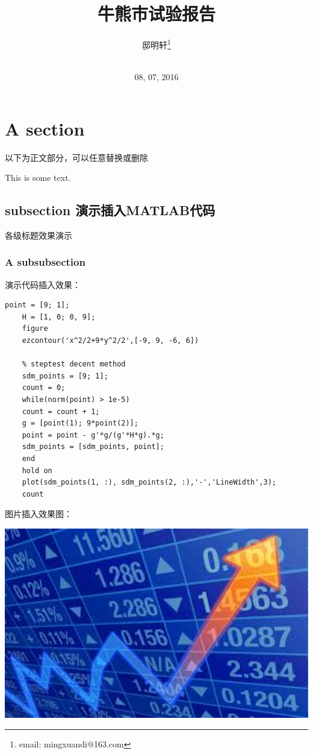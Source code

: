 \documentclass[10pt,a4paper]{article}
\author{邸明轩\footnote{email: mingxuandi@163.com}\\[2ex]
	\\[2ex]}
\title{牛熊市试验报告 \uppercase\expandafter{\romannumeral1}}
\date{08, 07, 2016}
\begin{document}
	
	\makeatletter
	\let\@afterindentfalse\@afterindenttrue
	\@afterindenttrue
	\makeatother
	\setlength{\parindent}{2em}  %
	
	\maketitle
	
	\section{A section}
	以下为正文部分，可以任意替换或删除
	
	This is some text.
	
	\subsection{ subsection 演示插入MATLAB代码}
	各级标题效果演示
	\subsubsection{A subsubsection}
	演示代码插入效果：
	\begin{lstlisting}[title=sd\_method.m, frame=shadowbox]
	point = [9; 1];
	H = [1, 0; 0, 9];
	figure
	ezcontour('x^2/2+9*y^2/2',[-9, 9, -6, 6])
	
	% steptest decent method
	sdm_points = [9; 1];
	count = 0;
	while(norm(point) > 1e-5)
	count = count + 1;
	g = [point(1); 9*point(2)];
	point = point - g'*g/(g'*H*g).*g;
	sdm_points = [sdm_points, point];
	end
	hold on
	plot(sdm_points(1, :), sdm_points(2, :),'-','LineWidth',3);
	count
	\end{lstlisting}
	图片插入效果图：
	\begin{center}
		\includegraphics[width=1\textwidth]{1.jpeg}
	\end{center}
\end{document}
